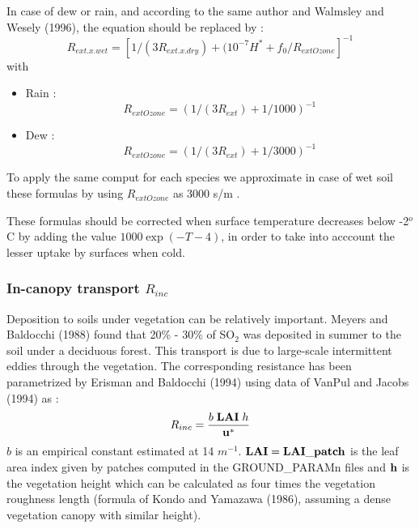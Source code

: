 In case of dew or rain, and according to the same author and
Walmsley and Wesely (1996)\nocite{Walmsley1996}, the equation should be replaced by :
\[R_{ext.x.wet}=[1/(3R_{ext.x.dry})+(10^{-7}H^*+f_0/R_{extOzone}]^{-1}\]
with

\begin{itemize}
 
\item { Rain : \[ R_{extOzone} = (1/(3R_{ext})+1/1000 )^{-1}\]  }
 
\item { Dew : \[ R_{extOzone} = (1/(3R_{ext})+1/3000 )^{-1}\]  }
\end{itemize}
 
To apply the same comput for each species we approximate in case of
wet soil these formulas by 
using $R_{extOzone}$ as 3000 s/m .

These formulas should be corrected when surface
temperature decreases below -2$^o$C by adding the value
$1000 \exp (-T-4)$, in order to take into acccount the lesser uptake
by surfaces 
when cold.
\subsubsection*{In-canopy transport $R_{inc}$}

Deposition to soils under vegetation can be relatively important. 
Meyers and Baldocchi (1988) found that 20\% - 30\% of SO$_2$ was deposited 
in summer to the soil under a deciduous forest.
This transport is due to large-scale intermittent eddies through the
vegetation. 
The corresponding resistance has been parametrized by Erisman and Baldocchi (1994)
using data of VanPul and Jacobs (1994)\nocite{VanPul1994}
as :
\[ R_{inc}=\frac{b\; {\bf LAI}\; h}{\bf{u^*}}\]        %
$b$ is an empirical constant estimated at 14 $m^{-1}$. $\bf LAI=
LAI\_patch$ is the  
leaf area index given by patches computed in the GROUND\_PARAMn files
and $\bf h$ is the 
vegetation height which can be calculated as four times the 
vegetation roughness length
(formula of Kondo and Yamazawa (1986)\nocite{Kondo1986}, assuming a dense vegetation canopy
with similar height).

\medskip
